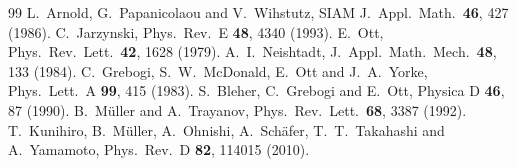 \documentclass[11pt,a4paper]{article}
\begin{document}
\begin{thebibliography}{99}
 L.~Arnold, G.~Papanicolaou and V.~Wihstutz, SIAM J.\ Appl.\ Math.\ {\bf 46}, 427 (1986).
 C.~Jarzynski, Phys.\ Rev.\ E {\bf 48}, 4340 (1993).
 E.~Ott, Phys.\ Rev.\ Lett.\ {\bf 42}, 1628 (1979).
 A.~I.~Neishtadt, J.\ Appl.\ Math.\ Mech.\ {\bf 48}, 133 (1984).
 C.~Grebogi, S.~W.~McDonald, E.~Ott and J.~A.~Yorke, Phys.\ Lett.\ A {\bf 99}, 415 (1983).
 S.~Bleher, C.~Grebogi and E.~Ott, Physica D {\bf 46}, 87 (1990).
 B.~M\"uller and A.~Trayanov, Phys.\ Rev.\ Lett.\ {\bf 68}, 3387 (1992).
 T.~Kunihiro, B.~M\"uller, A.~Ohnishi, A.~Sch\"afer, T.~T.~Takahashi and A.~Yamamoto, Phys.\ Rev.\ D {\bf 82}, 114015 (2010).
\end{thebibliography}
\end{document}
